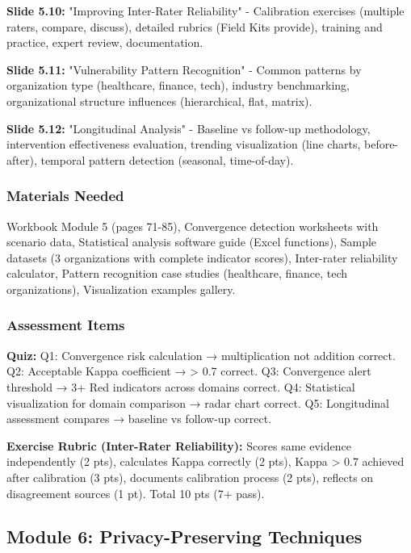 \documentclass[11pt,a4paper]{article}
\begin{document}
\textbf{Slide 5.10:} "Improving Inter-Rater Reliability" - Calibration exercises (multiple raters, compare, discuss), detailed rubrics (Field Kits provide), training and practice, expert review, documentation.

\textbf{Slide 5.11:} "Vulnerability Pattern Recognition" - Common patterns by organization type (healthcare, finance, tech), industry benchmarking, organizational structure influences (hierarchical, flat, matrix).

\textbf{Slide 5.12:} "Longitudinal Analysis" - Baseline vs follow-up methodology, intervention effectiveness evaluation, trending visualization (line charts, before-after), temporal pattern detection (seasonal, time-of-day).

\subsubsection{Materials Needed}

Workbook Module 5 (pages 71-85), Convergence detection worksheets with scenario data, Statistical analysis software guide (Excel functions), Sample datasets (3 organizations with complete indicator scores), Inter-rater reliability calculator, Pattern recognition case studies (healthcare, finance, tech organizations), Visualization examples gallery.

\subsubsection{Assessment Items}

\textbf{Quiz:} Q1: Convergence risk calculation → multiplication not addition correct. Q2: Acceptable Kappa coefficient → > 0.7 correct. Q3: Convergence alert threshold → 3+ Red indicators across domains correct. Q4: Statistical visualization for domain comparison → radar chart correct. Q5: Longitudinal assessment compares → baseline vs follow-up correct.

\textbf{Exercise Rubric (Inter-Rater Reliability):} Scores same evidence independently (2 pts), calculates Kappa correctly (2 pts), Kappa > 0.7 achieved after calibration (3 pts), documents calibration process (2 pts), reflects on disagreement sources (1 pt). Total 10 pts (7+ pass).

\subsection{Module 6: Privacy-Preserving Techniques}
\end{document}
